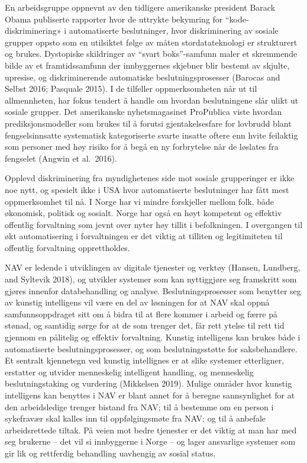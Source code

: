 \documentclass[
]{book}
\begin{document}
En arbeidsgruppe oppnevnt av den tidligere amerikanske president Barack Obama publiserte rapporter hvor de uttrykte bekymring for ``kode-diskriminering» i automatiserte beslutninger, hvor diskriminering av sosiale grupper oppsto som en utilsiktet følge av måten stordatateknologi er strukturert og brukes.
Dystopiske skildringer av ``svart boks''-samfunn maler et skremmende bilde av et framtidssamfunn der innbyggernes skjebner blir bestemt av skjulte, upresise, og diskriminerende automatiske beslutningsprosesser (Barocas and Selbst 2016; Pasquale 2015).
I de tilfeller oppmerksomheten når ut til allmennheten, har fokus tendert å handle om hvordan beslutningene slår ulikt ut sosiale grupper.
Det amerikanske nyhetsmagasinet ProPublica viste hvordan prediksjonsmodeller som brukes til å forutsi gjentakelsesfare for lovbrudd blant fengselsinnsatte systematisk kategoriserte svarte insatte oftere enn hvite feilaktig som personer med høy risiko for å begå en ny forbrytelse når de løslates fra fengselet (Angwin et al.~2016).

Opplevd diskriminering fra myndighetenes side mot sosiale grupperinger er ikke noe nytt, og spesielt ikke i USA hvor automatiserte beslutninger har fått mest oppmerksomhet til nå.
I Norge har vi mindre forskjeller mellom folk, både økonomisk, politisk og sosialt. Norge har også en høyt kompetent og effektiv offentlig forvaltning som jevnt over nyter høy tillit i befolkningen.
I overgangen til økt automatisering i forvaltningen er det viktig at tilliten og legitimiteten til offentlig forvaltning opprettholdes.

NAV er ledende i utviklingen av digitale tjenester og verktøy (Hansen, Lundberg, and Syltevik 2018), og utvikler systemer som kan nyttiggjøre seg framskritt som gjøres innenfor databehandling og analyse.
Beslutningsprosesser som benytter seg av kunstig intelligens vil være en del av løsningen for at NAV skal oppnå samfunnsoppdraget sitt om å bidra til at flere kommer i arbeid og færre på stønad, og samtidig sørge for at de som trenger det, får rett ytelse til rett tid gjennom en pålitelig og effektiv forvaltning.
Kunstig intelligens kan brukes både i automatiserte beslutningsprosesser, og som beslutningsstøtte for saksbehandlere.
Et sentralt kjennetegn ved kunstig intellignes er at slike systemer etterligner, erstatter og utvider menneskelig intelligent handling, og menneskelig beslutningstaking og vurdering (Mikkelsen 2019).
Mulige områder hvor kunstig intelligens kan benyttes i NAV er blant annet for å beregne sannsynlighet for at den arbeidsledige trenger bistand fra NAV; til å bestemme om en person i sykefravær skal kalles inn til oppfølgingsmøte fra NAV; og til å anbefale arbeidsrettede tiltak.
På veien mot bedre tjenester er det viktig at man har med seg brukerne -- det vil si innbyggerne i Norge -- og lager ansvarlige systemer som gir lik og rettferdig behandling uavhengig av sosial status.
\end{document}
